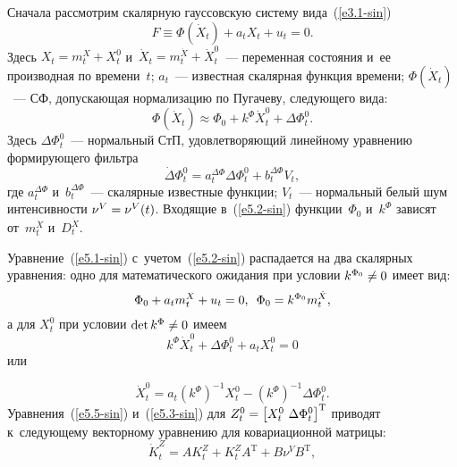\begin{multicols}{2}
Сначала рассмотрим скалярную гауссовскую сис\-те\-му вида~(\ref{e3.1-sin})
\begin{equation}
    F\equiv\Phi (\dot X_t) + a_t X_t + u_t =0.
    \label{e5.1-sin}
    \end{equation}
Здесь $X_t=m_t^X+X_t^0$ и~$\dot X_t = m_t^{\dot X} + \dot X_t^0$~--- 
переменная состояния и~ее производная по времени~$t$; $a_t$~--- 
известная скалярная функция времени; $\Phi(\dot X_t)$~--- 
СФ, допускающая нормализацию по Пугачеву, \mbox{сле\-ду\-юще\-го} вида:
\begin{equation}
    \Phi (\dot X_t) \approx \Phi_0 + k^\Phi \dot X_t^0 + \Delta \Phi_t^0.
    \label{e5.2-sin}
        \end{equation}
Здесь $\Delta \Phi_t^0$~--- нормальный СтП, удовлетворяющий линейному уравнению формирующего фильт\-ра
\begin{equation}
    \dot\Delta \Phi_t^0 = a_t^{\Delta \Phi} \Delta\Phi_t^0 + b_t^{\Delta\Phi} V_t,
    \label{e5.3-sin}
        \end{equation}
где $a_t^{\Delta\Phi}$ и~$b_t^{\Delta\Phi}$~--- скалярные известные функции; 
$V_t$~--- нормальный белый шум интенсивности  $\nu^V\hm=\nu^V(t)$. 
Входящие в~(\ref{e5.2-sin}) функции~$\Phi_0$ и~$k^\Phi$ зависят от~$m_t^{\dot X}$ и~$D_t^{\dot X}$.

Уравнение~(\ref{e5.1-sin}) с~учетом~(\ref{e5.2-sin}) 
распадается на два скалярных уравнения: одно для математического ожидания при условии  $k^{\Phi_0}\hm\ne 0$ 
имеет вид:
\begin{equation}
\Phi_0 + a_tm_t^X +u_t =0,\enskip \Phi_0 = k^{\Phi_0} m_t^{\dot X},
    \label{e5.4-sin}
        \end{equation}
а для  $X_t^0$ при условии  $\det k^\Phi\hm\ne 0$ имеем
    $$
    k^\Phi \dot X_t^0 +\Delta\Phi_t^0 + a_t X_t^0 =0
    $$
или

\vspace*{-2pt}

\noindent
\begin{equation}
\dot X_t^0 = a_t (k^\Phi)^{-1} X_t^0 -\left(k^\Phi\right)^{-1} \Delta \Phi_t^0.
\label{e5.5-sin}
\end{equation}
Уравнения~(\ref{e5.5-sin}) и~(\ref{e5.3-sin}) для $Z_t^0\hm= \lk X_t^0\ \Delta\Phi_t^0\rk^{\mathrm{T}}$ 
приводят к~сле\-ду\-юще\-му векторному уравнению для ковариационной мат\-рицы:
\begin{equation}
    \dot K_t^Z = AK_t^Z +K_t^Z A^{\mathrm{T}} +B\nu^V B^{\mathrm{T}},\label{e5.6-sin}
        \end{equation}
        

\end{multicols}

